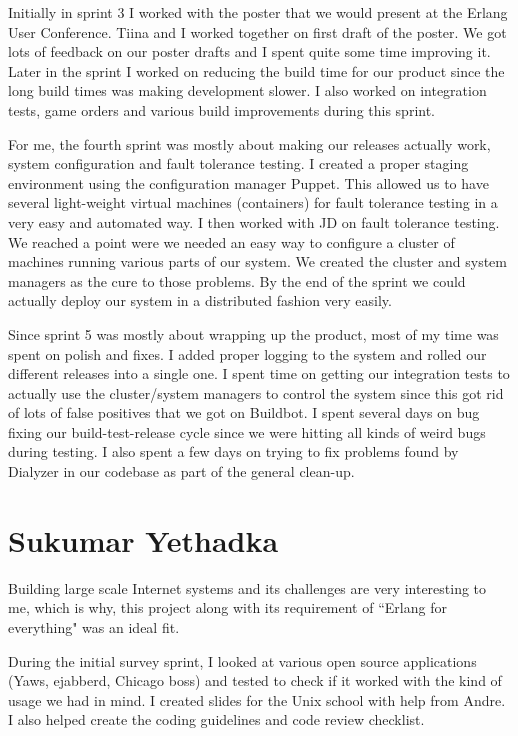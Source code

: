 \documentclass[11pt,a4paper]{report}
\begin{document}
Initially in sprint 3 I worked with the poster that we would present at the
Erlang User Conference. Tiina and I worked together on first draft of the
poster. We got lots of feedback on our poster drafts and I spent quite some time
improving it. Later in the sprint I worked on reducing the build time for our
product since the long build times was making development slower. I also worked
on integration tests, game orders and various build improvements during this
sprint.

For me, the fourth sprint was mostly about making our releases actually work,
system configuration and fault tolerance testing. I created a proper staging
environment using the configuration manager Puppet. This allowed us to have
several light-weight virtual machines (containers) for fault tolerance testing
in a very easy and automated way. I then worked with JD on fault
tolerance testing. We reached a point were we needed an easy way to configure a
cluster of machines running various parts of our system. We created the cluster
and system managers as the cure to those problems. By the end of the sprint we
could actually deploy our system in a distributed fashion very easily.

Since sprint 5 was mostly about wrapping up the product, most of my time was
spent on polish and fixes. I added proper logging to the system and rolled our
different releases into a single one. I spent time on getting our integration
tests to actually use the cluster/system managers to control the system since
this got rid of lots of false positives that we got on Buildbot. I spent several
days on bug fixing our build-test-release cycle since we were hitting all kinds
of weird bugs during testing. I also spent a few days on trying to fix problems
found by Dialyzer in our codebase as part of the general clean-up.
\section{Sukumar Yethadka}
Building large scale Internet systems and its challenges are very interesting to
me, which is why, this project along with its requirement of ``Erlang for
everything" was an ideal fit.

During the initial survey sprint, I looked at various open source applications
(Yaws, ejabberd, Chicago boss) and tested to check if it worked with the kind of
usage we had in mind. I created slides for the Unix school with help from
Andre. I also helped create the coding guidelines and code review checklist.
\end{document}
